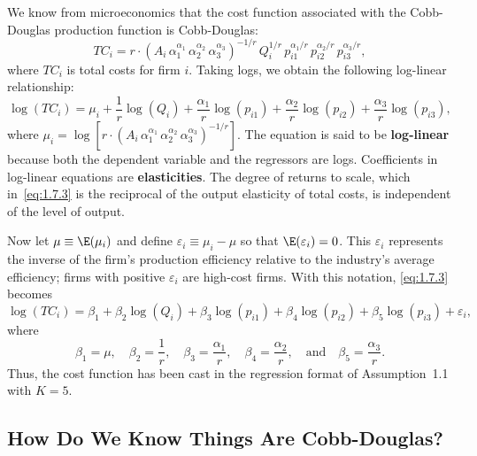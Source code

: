 We know from microeconomics that the cost function associated with the Cobb-Douglas
production function is Cobb-Douglas:
\begin{equation}
  TC_i = r \cdot (A_i \, \alpha_1^{\alpha_1} \, \alpha_2^{\alpha_2} \,
    \alpha_3^{\alpha_3})^{-1/r} \, Q_i^{1/r} \, p_{i1}^{\alpha_1/r} \,
    p_{i2}^{\alpha_2/r} \, p_{i3}^{\alpha_3/r},
  \label{eq:1.7.2}
\end{equation}
where $TC_i$ is total costs for firm $i$.  Taking logs, we obtain the following
log-linear relationship:
\begin{equation}
  \log(TC_i) = \mu_i + \frac{1}{r}\log(Q_i) + \frac{\alpha_1}{r}\log(p_{i1})
    + \frac{\alpha_2}{r}\log(p_{i2}) + \frac{\alpha_3}{r}\log(p_{i3}),
  \label{eq:1.7.3}
\end{equation}
where $\mu_i = \log[r \cdot (A_i \, \alpha_1^{\alpha_1} \, \alpha_2^{\alpha_2} \,
\alpha_3^{\alpha_3})^{-1/r}]$.  The equation is said to be \textbf{log-linear} because
both the dependent variable and the regressors are logs.  Coefficients in log-linear
equations are \textbf{elasticities}.  The degree of returns to scale, which
in~\eqref{eq:1.7.3} is the reciprocal of the output elasticity of total costs, is
independent of the level of output.

Now let $\mu \equiv \E(\mu_i)$ and define $\varepsilon_i \equiv \mu_i - \mu$ so that
$\E(\varepsilon_i) = 0$.  This $\varepsilon_i$ represents the inverse of the firm's
production efficiency relative to the industry's average efficiency; firms with positive
$\varepsilon_i$ are high-cost firms.  With this notation, \eqref{eq:1.7.3} becomes
\begin{equation}
  \log(TC_i) = \beta_1 + \beta_2 \log(Q_i) + \beta_3 \log(p_{i1})
    + \beta_4 \log(p_{i2}) + \beta_5 \log(p_{i3}) + \varepsilon_i,
  \label{eq:1.7.4}
\end{equation}
where
\begin{equation}
  \beta_1 = \mu, \quad \beta_2 = \frac{1}{r}, \quad \beta_3 = \frac{\alpha_1}{r},
  \quad \beta_4 = \frac{\alpha_2}{r}, \quad \text{and} \quad
  \beta_5 = \frac{\alpha_3}{r}.
  \label{eq:1.7.5}
\end{equation}
Thus, the cost function has been cast in the regression format of Assumption~1.1
with $K = 5$.

\subsection*{How Do We Know Things Are Cobb-Douglas?}

